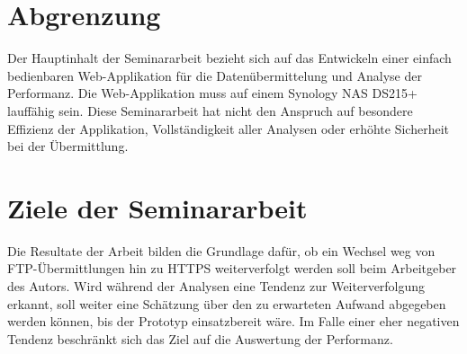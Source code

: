 \section{Abgrenzung}
Der Hauptinhalt der Seminararbeit bezieht sich auf das Entwickeln einer einfach bedienbaren Web-Applikation für die Datenübermittelung und Analyse der Performanz.
Die Web-Applikation muss auf einem Synology NAS DS215+ lauffähig sein.
Diese Seminararbeit hat nicht den Anspruch auf besondere Effizienz der Applikation, 
Vollständigkeit aller Analysen oder erhöhte Sicherheit bei der Übermittlung. 

\section{Ziele der Seminararbeit}
Die Resultate der Arbeit bilden die Grundlage dafür, ob ein Wechsel weg von FTP-Übermittlungen hin zu HTTPS weiterverfolgt werden soll beim Arbeitgeber des Autors.
Wird während der Analysen eine Tendenz zur Weiterverfolgung erkannt, soll weiter eine Schätzung über den zu erwarteten Aufwand abgegeben werden können, bis der Prototyp einsatzbereit wäre.
Im Falle einer eher negativen Tendenz beschränkt sich das Ziel auf die Auswertung der Performanz.